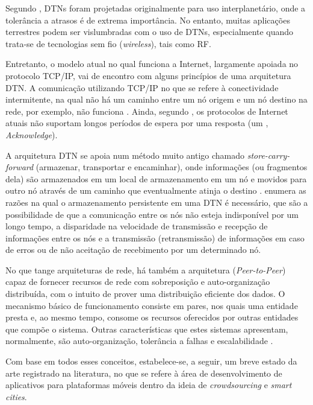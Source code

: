 Segundo , DTNs foram projetadas originalmente para uso interplanetário, onde a tolerância a atrasos é de extrema importância. No entanto, muitas aplicações terrestres podem ser vislumbradas com o uso de DTNs, especialmente quando trata-se de tecnologias sem fio (\textit{wireless}), tais como RF.

Entretanto, o modelo atual no qual funciona a Internet, largamente apoiada no protocolo TCP/IP, vai de encontro com alguns princípios de uma arquitetura DTN. A comunicação utilizando TCP/IP no que se refere à conectividade intermitente, na qual não há um caminho entre um nó origem e um nó destino na rede, por exemplo, não funciona \cite{warthman}. Ainda, segundo , os protocolos de Internet atuais não suportam longos períodos de espera por uma resposta (um , \textit{Acknowledge}).

A arquitetura DTN se apoia num método muito antigo chamado \emph{store-carry-forward} (armazenar, transportar e encaminhar), onde informações (ou fragmentos dela) são armazenados em um local de armazenamento em um nó e movidos para outro nó através de um caminho que eventualmente atinja o destino \cite{warthman}.  enumera as razões na qual o armazenamento persistente em uma DTN é necessário, que são a possibilidade de que a comunicação entre os nós não esteja indisponível por um longo tempo, a disparidade na velocidade de transmissão e recepção de informações entre os nós e a transmissão (retransmissão) de informações em caso de erros ou de não aceitação de recebimento por um determinado nó.

No que tange arquiteturas de rede, há também a arquitetura  (\emph{Peer-to-Peer}) capaz de fornecer recursos de rede com sobreposição e auto-organização distribuída, com o intuito de prover uma distribuição eficiente dos dados. O mecanismo básico de funcionamento consiste em pares, nos quais uma entidade presta e, ao mesmo tempo, consome os recursos oferecidos por outras entidades que compõe o sistema. Outras características que estes sistemas apresentam, normalmente, são auto-organização, tolerância a falhas e escalabilidade \cite{italianos}.

Com base em todos esses conceitos, estabelece-se, a seguir, um breve estado da arte registrado na literatura, no que se refere à área de desenvolvimento de aplicativos para plataformas móveis dentro da ideia de \emph{crowdsourcing} e \emph{smart cities}.

